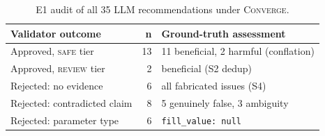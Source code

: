 \begin{table}[t]
\centering
\caption{E1 audit of all 35 LLM recommendations under \textsc{Converge}.}
\label{tab:audit}
\footnotesize
\begin{tabular}{@{}lrl@{}}
\toprule
\textbf{Validator outcome} & \textbf{n} & \textbf{Ground-truth assessment}\\
\midrule
Approved, \textsc{safe} tier & 13 & 11 beneficial, 2 harmful (conflation)\\
Approved, \textsc{review} tier & 2 & beneficial (S2 dedup)\\
Rejected: no evidence & 6 & all fabricated issues (S4)\\
Rejected: contradicted claim & 8 & 5 genuinely false, 3 ambiguity\\
Rejected: parameter type & 6 & \texttt{fill\_value: null}\\
\bottomrule
\end{tabular}
\end{table}
